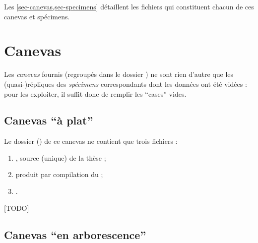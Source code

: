 Les \vref{sec-canevas,sec-specimens} détaillent les fichiers qui constituent
chacun de ces canevas et spécimens.




\section{Canevas}
\label{sec-canevas}

Les \emph{canevas} fournis (regroupés dans le dossier ) ne sont
rien d'autre que les (quasi-)répliques des \emph{spécimens} correspondants dont
les données ont été vidées : pour les exploiter, il suffit donc de remplir les
\enquote{cases} vides.

\subsection{Canevas \enquote{à plat}}
\label{sec-canevas-a-plat}

Le dossier () de ce canevas ne contient que trois fichiers :
\begin{enumerate}
\item {}, source  (unique) de la thèse  ;
\item {} produit par compilation du  ;
\item {}.
\end{enumerate}

[TODO]

\subsection{Canevas \enquote{en arborescence}}
\label{sec-canevas-arborescence}

